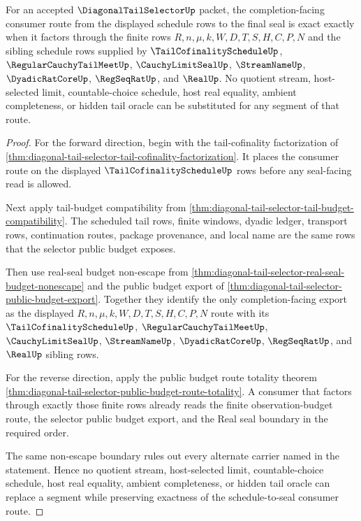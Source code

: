 \begin{theorem}
\label{thm:diagonal-tail-selector-schedule-seal-consumer-exactness}
For an accepted $\DiagonalTailSelectorUp$ packet, the completion-facing
consumer route from the displayed schedule rows to the final seal is exact
exactly when it factors through the finite rows
$R,n,\mu,k,W,D,T,S,H,C,P,N$ and the sibling schedule rows supplied by
$\TailCofinalityScheduleUp$, $\RegularCauchyTailMeetUp$,
$\CauchyLimitSealUp$, $\StreamNameUp$, $\DyadicRatCoreUp$, $\RegSeqRatUp$,
and $\RealUp$. No quotient stream, host-selected limit, countable-choice
schedule, host real equality, ambient completeness, or hidden tail oracle can
be substituted for any segment of that route.
\end{theorem}
\begin{proof}
For the forward direction, begin with the tail-cofinality factorization of
\autoref{thm:diagonal-tail-selector-tail-cofinality-factorization}. It places
the consumer route on the displayed $\TailCofinalityScheduleUp$ rows before
any seal-facing read is allowed.

Next apply tail-budget compatibility from
\autoref{thm:diagonal-tail-selector-tail-budget-compatibility}. The scheduled
tail rows, finite windows, dyadic ledger, transport rows, continuation routes,
package provenance, and local name are the same rows that the selector public
budget exposes.

Then use real-seal budget non-escape from
\autoref{thm:diagonal-tail-selector-real-seal-budget-nonescape} and the public
budget export of \autoref{thm:diagonal-tail-selector-public-budget-export}.
Together they identify the only completion-facing export as the displayed
$R,n,\mu,k,W,D,T,S,H,C,P,N$ route with its
$\TailCofinalityScheduleUp$, $\RegularCauchyTailMeetUp$,
$\CauchyLimitSealUp$, $\StreamNameUp$, $\DyadicRatCoreUp$, $\RegSeqRatUp$, and
$\RealUp$ sibling rows.

For the reverse direction, apply the public budget route totality theorem
\autoref{thm:diagonal-tail-selector-public-budget-route-totality}. A consumer
that factors through exactly those finite rows already reads the finite
observation-budget route, the selector public budget export, and the Real seal
boundary in the required order.

The same non-escape boundary rules out every alternate carrier named in the
statement. Hence no quotient stream, host-selected limit, countable-choice
schedule, host real equality, ambient completeness, or hidden tail oracle can
replace a segment while preserving exactness of the schedule-to-seal consumer
route.
\end{proof}

